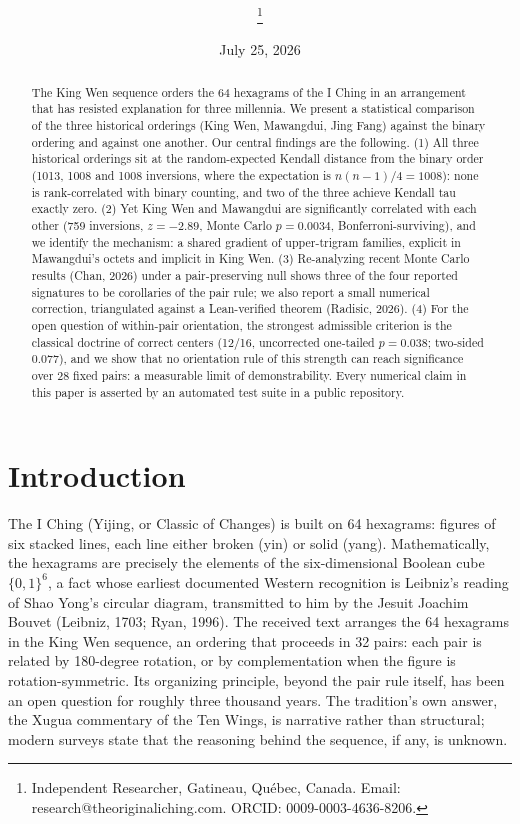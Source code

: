 \documentclass[11pt]{article}
\title{\papertitle\\[0.35em]
  {\large \papersubtitle}}
\author{\paperauthor\thanks{Independent Researcher, Gatineau, Québec, Canada. Email: research@theoriginaliching.com. ORCID: 0009-0003-4636-8206.}}
\date{July 25, 2026}
\begin{document}
\maketitle

\begin{abstract}
The King Wen sequence orders the 64 hexagrams of the I Ching in an arrangement that has resisted explanation for three millennia. We present a statistical comparison of the three historical orderings (King Wen, Mawangdui, Jing Fang) against the binary ordering and against one another. Our central findings are the following. (1) All three historical orderings sit at the random-expected Kendall distance from the binary order (1013, 1008 and 1008 inversions, where the expectation is $n(n-1)/4 = 1008$): none is rank-correlated with binary counting, and two of the three achieve Kendall tau exactly zero. (2) Yet King Wen and Mawangdui are significantly correlated with each other (759 inversions, $z = -2.89$, Monte Carlo $p = 0.0034$, Bonferroni-surviving), and we identify the mechanism: a shared gradient of upper-trigram families, explicit in Mawangdui's octets and implicit in King Wen. (3) Re-analyzing recent Monte Carlo results (Chan, 2026) under a pair-preserving null shows three of the four reported signatures to be corollaries of the pair rule; we also report a small numerical correction, triangulated against a Lean-verified theorem (Radisic, 2026). (4) For the open question of within-pair orientation, the strongest admissible criterion is the classical doctrine of correct centers (12/16, uncorrected one-tailed $p = 0.038$; two-sided 0.077), and we show that no orientation rule of this strength can reach significance over 28 fixed pairs: a measurable limit of demonstrability. Every numerical claim in this paper is asserted by an automated test suite in a public repository.
\end{abstract}

\section{Introduction}

The I Ching (Yijing, or Classic of Changes) is built on 64 hexagrams: figures of six stacked lines, each line either broken (yin) or solid (yang). Mathematically, the hexagrams are precisely the elements of the six-dimensional Boolean cube $\{0,1\}^6$, a fact whose earliest documented Western recognition is Leibniz's reading of Shao Yong's circular diagram, transmitted to him by the Jesuit Joachim Bouvet (Leibniz, 1703; Ryan, 1996). The received text arranges the 64 hexagrams in the King Wen sequence, an ordering that proceeds in 32 pairs: each pair is related by 180-degree rotation, or by complementation when the figure is rotation-symmetric. Its organizing principle, beyond the pair rule itself, has been an open question for roughly three thousand years. The tradition's own answer, the Xugua commentary of the Ten Wings, is narrative rather than structural; modern surveys state that the reasoning behind the sequence, if any, is unknown.
\end{document}
